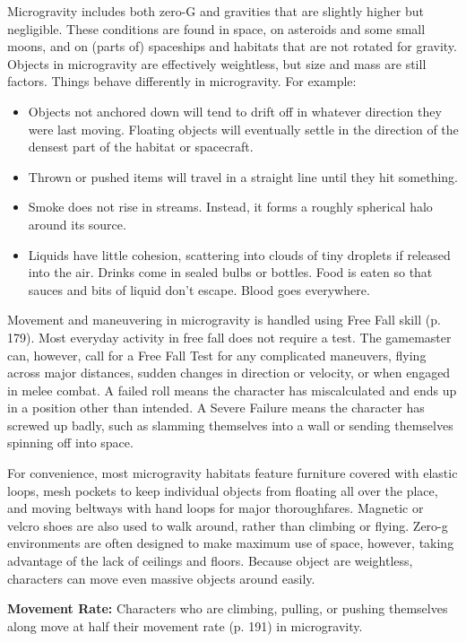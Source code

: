 Microgravity includes both zero-G and gravities that are slightly higher but negligible. These conditions are found in space, on asteroids and some small moons, and on (parts of) spaceships and habitats that are not rotated for gravity. Objects in microgravity are effectively weightless, but size and mass are still factors. Things behave differently in microgravity. For example:

\begin{itemize}
\item Objects not anchored down will tend to drift off in whatever direction they were last moving. Floating objects will eventually settle in the direction of the densest part of the habitat or spacecraft.
\item Thrown or pushed items will travel in a straight line until they hit something.
\item Smoke does not rise in streams. Instead, it forms a roughly spherical halo around its source.
\item Liquids have little cohesion, scattering into clouds of tiny droplets if released into the air. Drinks come in sealed bulbs or bottles. Food is eaten so that sauces and bits of liquid don’t escape. Blood goes everywhere.
\end{itemize}

Movement and maneuvering in microgravity is handled using Free Fall skill (p. 179). Most everyday activity in free fall does not require a test. The gamemaster can, however, call for a Free Fall Test for any complicated maneuvers, flying across major distances, sudden changes in direction or velocity, or when engaged in melee combat. A failed roll means the character has miscalculated and ends up in a position other than intended. A Severe Failure means the character has screwed up badly, such as slamming themselves into a wall or sending themselves spinning off into space.

For convenience, most microgravity habitats feature furniture covered with elastic loops, mesh pockets to keep individual objects from floating all over the place, and moving beltways with hand loops for major thoroughfares. Magnetic or velcro shoes are also used to walk around, rather than climbing or flying. Zero-g environments are often designed to make maximum use of space, however, taking advantage of the lack of ceilings and floors. Because object are weightless, characters can move even massive objects around easily.

\textbf{Movement Rate:} Characters who are climbing, pulling, or pushing themselves along move at half their movement rate (p. 191) in microgravity.

